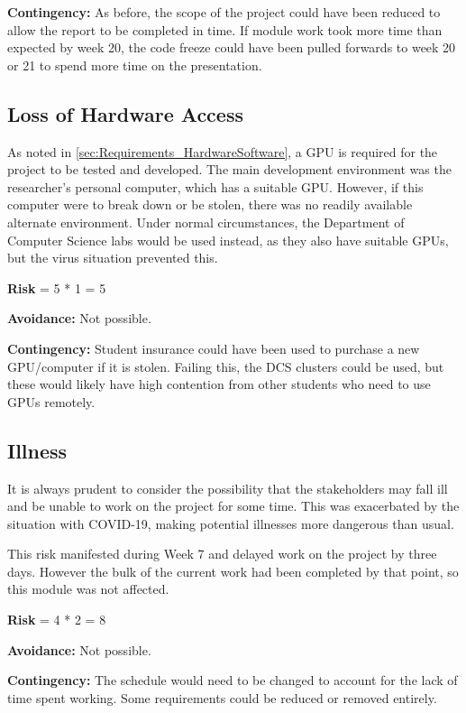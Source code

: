 \textbf{Contingency:}
As before, the scope of the project could have been reduced to allow the report to be completed in time.
If module work took more time than expected by week 20, the code freeze could have been pulled forwards to week 20 or 21 to spend more time on the presentation.


\subsection{Loss of Hardware Access}
As noted in \cref{sec:Requirements_HardwareSoftware}, a GPU is required for the project to be tested and developed.
The main development environment was the researcher's personal computer, which has a suitable GPU.
However, if this computer were to break down or be stolen, there was no readily available alternate environment.
Under normal circumstances, the Department of Computer Science labs would be used instead, as they also have suitable GPUs, but the virus situation prevented this.

\textbf{Risk} = 5 * 1 = 5

\textbf{Avoidance:}
Not possible.

\textbf{Contingency:}
Student insurance could have been used to purchase a new GPU/computer if it is stolen.
Failing this, the DCS clusters could be used, but these would likely have high contention from other students who need to use GPUs remotely.

\subsection{Illness}
It is always prudent to consider the possibility that the stakeholders may fall ill and be unable to work on the project for some time.
This was exacerbated by the situation with COVID-19, making potential illnesses more dangerous than usual.

This risk manifested during Week 7 and delayed work on the project by three days.
However the bulk of the current work had been completed by that point, so this module was not affected.%

\textbf{Risk} = 4 * 2 = 8

\textbf{Avoidance:}
Not possible.

\textbf{Contingency:}
The schedule would need to be changed to account for the lack of time spent working.
Some requirements could be reduced or removed entirely.

